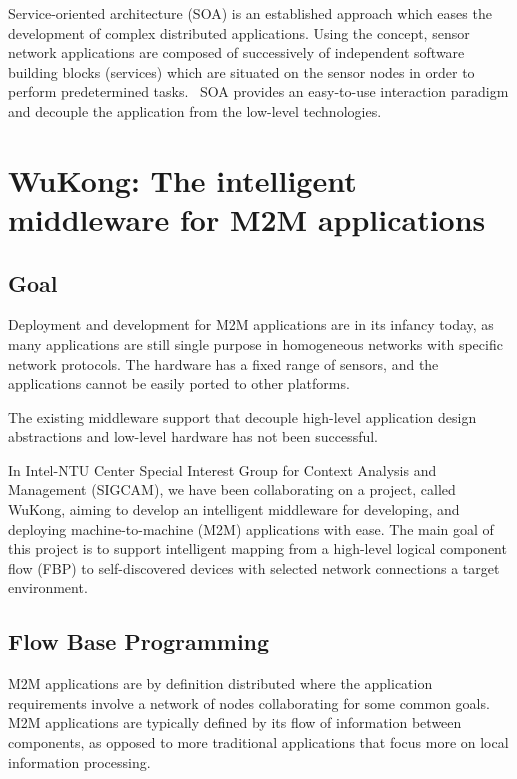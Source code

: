 Service-oriented architecture (SOA) is an established approach which eases the
development of complex distributed applications. Using the concept, sensor
network applications are composed of successively of independent software
building blocks (services) which are situated on the sensor nodes in order to
perform predetermined tasks.~\cite{Neumann2010, Marin-Perianu2007} SOA provides
an easy-to-use interaction paradigm and decouple the application from the
low-level technologies.

\section{WuKong: The intelligent middleware for M2M applications}

\subsection{Goal}

Deployment and development for M2M applications are in its infancy today, as
many applications are still single purpose in homogeneous networks with
specific network protocols. The hardware has a fixed range of sensors, and the
applications cannot be easily ported to other platforms.

The existing middleware support that decouple high-level application design
abstractions and low-level hardware has not been successful.

In Intel-NTU Center Special Interest Group for Context Analysis and Management 
(SIGCAM), we have been collaborating on a project, called WuKong, aiming to develop 
an intelligent middleware for developing, and deploying machine-to-machine 
(M2M) applications with ease. The main goal of this project is to support
intelligent mapping from a high-level logical component flow (FBP) to
self-discovered devices with selected network connections a target
environment\cite{Reijers}.

\subsection{Flow Base Programming}

M2M applications are by definition distributed where the application
requirements involve a network of nodes collaborating for some common 
goals. M2M applications are typically defined by its flow of information
between components, as opposed to more traditional applications that focus more
on local information processing.

